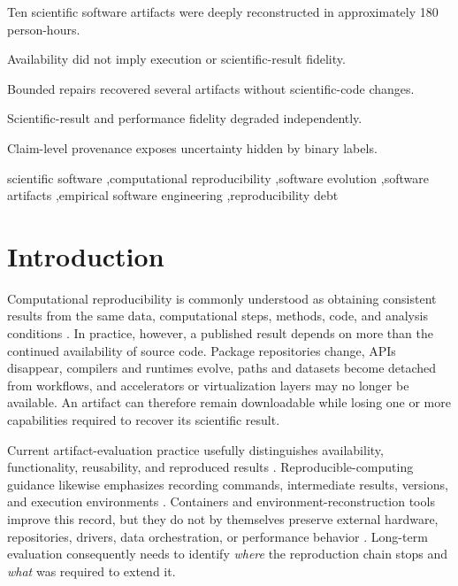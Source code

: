 \documentclass[a4paper,fleqn]{cas-dc}
\begin{document}
\begin{highlights}
\item Ten scientific software artifacts were deeply reconstructed in approximately 180 person-hours.
\item Availability did not imply execution or scientific-result fidelity.
\item Bounded repairs recovered several artifacts without scientific-code changes.
\item Scientific-result and performance fidelity degraded independently.
\item Claim-level provenance exposes uncertainty hidden by binary labels.
\end{highlights}

\begin{keywords}
scientific software \sep computational reproducibility \sep software evolution \sep software artifacts \sep empirical software engineering \sep reproducibility debt
\end{keywords}

\maketitle

\section{Introduction}

Computational reproducibility is commonly understood as obtaining consistent results from the same data, computational steps, methods, code, and analysis conditions \citep{nasem2019reproducibility}. In practice, however, a published result depends on more than the continued availability of source code. Package repositories change, APIs disappear, compilers and runtimes evolve, paths and datasets become detached from workflows, and accelerators or virtualization layers may no longer be available. An artifact can therefore remain downloadable while losing one or more capabilities required to recover its scientific result.

Current artifact-evaluation practice usefully distinguishes availability, functionality, reusability, and reproduced results \citep{acm2020badging}. Reproducible-computing guidance likewise emphasizes recording commands, intermediate results, versions, and execution environments \citep{sandve2013ten}. Containers and environment-reconstruction tools improve this record, but they do not by themselves preserve external hardware, repositories, drivers, data orchestration, or performance behavior \citep{boettiger2015docker,chan2023rang}. Long-term evaluation consequently needs to identify \emph{where} the reproduction chain stops and \emph{what} was required to extend it.
\end{document}
